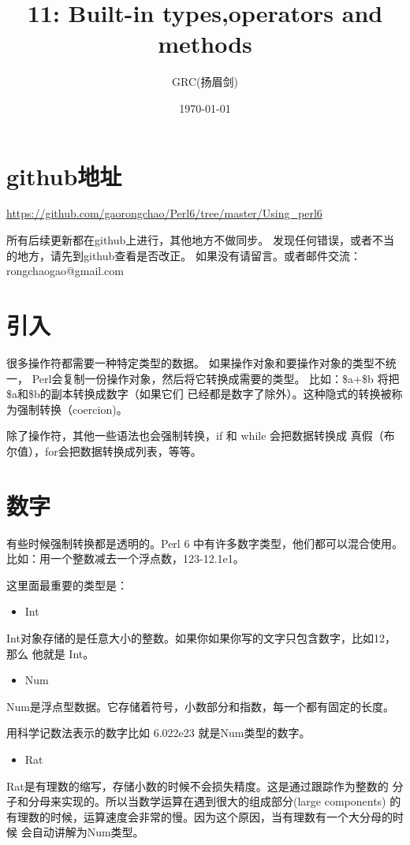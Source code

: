 \documentclass{ctexart}
\title{11: Built-in types,operators and methods}
\author{GRC(扬眉剑)}
\date{\today}
\begin{document}
\maketitle

\setcounter{tocdepth}{3}
\tableofcontents
\vspace*{1cm}
\section{github地址}
\label{sec-1}

\href{https://github.com/gaorongchao/Perl6/tree/master/Using_perl6}{https://github.com/gaorongchao/Perl6/tree/master/Using\_perl6}

所有后续更新都在github上进行，其他地方不做同步。
发现任何错误，或者不当的地方，请先到github查看是否改正。
如果没有请留言。或者邮件交流：rongchaogao@gmail.com
\section{引入}
\label{sec-2}

很多操作符都需要一种特定类型的数据。
如果操作对象和要操作对象的类型不统一，
Perl会复制一份操作对象，然后将它转换成需要的类型。
比如：\$a+\$b 将把\$a和\$b的副本转换成数字（如果它们
已经都是数字了除外）。这种隐式的转换被称为强制转换（coercion)。

除了操作符，其他一些语法也会强制转换，if 和 while 会把数据转换成
真假（布尔值），for会把数据转换成列表，等等。
\section{数字}
\label{sec-3}

有些时候强制转换都是透明的。Perl 6 中有许多数字类型，他们都可以混合使用。
比如：用一个整数减去一个浮点数，123-12.1e1。

这里面最重要的类型是：
\begin{itemize}
\item Int
\end{itemize}
Int对象存储的是任意大小的整数。如果你如果你写的文字只包含数字，比如12，那么
他就是 Int。
\begin{itemize}
\item Num
\end{itemize}
Num是浮点型数据。它存储着符号，小数部分和指数，每一个都有固定的长度。

用科学记数法表示的数字比如 6.022e23 就是Num类型的数字。

\begin{itemize}
\item Rat
\end{itemize}
Rat是有理数的缩写，存储小数的时候不会损失精度。这是通过跟踪作为整数的
分子和分母来实现的。所以当数学运算在遇到很大的组成部分(large components)
的有理数的时候，运算速度会非常的慢。因为这个原因，当有理数有一个大分母的时候
会自动讲解为Num类型。
\end{document}
